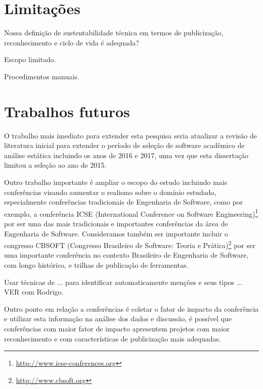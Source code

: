 
\section{Limitações}

Nossa definição de sustentabilidade técnica em termos de publicização,
reconhecimento e ciclo de vida é adequada?

Escopo limitado.

Procedimentos manuais.




\section{Trabalhos futuros}


O trabalho mais imediato para extender esta pesquisa seria atualizar a revisão
de literatura inicial para extender o período de seleção de software acadêmico
de análise estática incluindo os anos de 2016 e 2017, uma vez que esta
dissertação limitou a seleção ao ano de 2015.

Outro trabalho importante é ampliar o escopo do estudo incluindo mais
conferências visando aumentar o realismo sobre o domínio estudado,
especialmente conferências tradicionais de Engenharia de Software, como por
exemplo, a conferência ICSE (International Conference on Software
Engineering)\footnote{\url{http://www.icse-conferences.org}} por ser uma das
mais tradicionais e importantes conferências da área de Engenharia de Software.
Consideramos também ser importante incluir o congresso CBSOFT (Congresso
Brasileiro de Software: Teoria e Prática)\footnote{\url{http://www.cbsoft.org}}
por ser uma importante conferência no contexto Brasileiro de Engenharia de
Software, com longo histórico, e trilhas de publicação de ferramentas.

Usar técnicas de ... para identificar automaticamente menções e seus tipos ...
VER com Rodrigo.



Outro ponto em relação a conferências é coletar o fator de impacto da
conferência e utilizar esta informação na análise dos dados e discussão, é
possível que conferências com maior fator de impacto apresentem projetos com
maior reconhecimento e com características de publicização mais adequadas.

